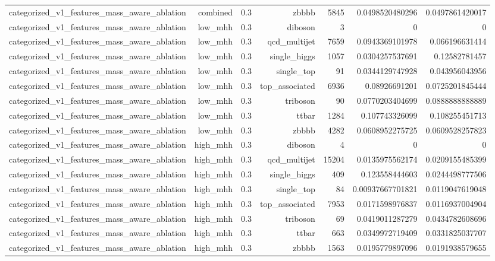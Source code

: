 \begin{table}[htbp]
{\begin{tabular}{lrrrrrr}
categorized\_v1\_features\_mass\_aware\_ablation & combined & 0.3 & zbbbb & 5845 & 0.0498520480296 & 0.0497861420017 \\
categorized\_v1\_features\_mass\_aware\_ablation & low\_mhh & 0.3 & diboson & 3 & 0 & 0 \\
categorized\_v1\_features\_mass\_aware\_ablation & low\_mhh & 0.3 & qcd\_multijet & 7659 & 0.0943369101978 & 0.066196631414 \\
categorized\_v1\_features\_mass\_aware\_ablation & low\_mhh & 0.3 & single\_higgs & 1057 & 0.0304257537691 & 0.12582781457 \\
categorized\_v1\_features\_mass\_aware\_ablation & low\_mhh & 0.3 & single\_top & 91 & 0.0344129747928 & 0.043956043956 \\
categorized\_v1\_features\_mass\_aware\_ablation & low\_mhh & 0.3 & top\_associated & 6936 & 0.08926691201 & 0.0725201845444 \\
categorized\_v1\_features\_mass\_aware\_ablation & low\_mhh & 0.3 & triboson & 90 & 0.0770203404699 & 0.0888888888889 \\
categorized\_v1\_features\_mass\_aware\_ablation & low\_mhh & 0.3 & ttbar & 1284 & 0.107743326099 & 0.108255451713 \\
categorized\_v1\_features\_mass\_aware\_ablation & low\_mhh & 0.3 & zbbbb & 4282 & 0.0608952275725 & 0.0609528257823 \\
categorized\_v1\_features\_mass\_aware\_ablation & high\_mhh & 0.3 & diboson & 4 & 0 & 0 \\
categorized\_v1\_features\_mass\_aware\_ablation & high\_mhh & 0.3 & qcd\_multijet & 15204 & 0.0135975562174 & 0.0209155485399 \\
categorized\_v1\_features\_mass\_aware\_ablation & high\_mhh & 0.3 & single\_higgs & 409 & 0.123558444603 & 0.0244498777506 \\
categorized\_v1\_features\_mass\_aware\_ablation & high\_mhh & 0.3 & single\_top & 84 & 0.00937667701821 & 0.0119047619048 \\
categorized\_v1\_features\_mass\_aware\_ablation & high\_mhh & 0.3 & top\_associated & 7953 & 0.0171598976837 & 0.0116937004904 \\
categorized\_v1\_features\_mass\_aware\_ablation & high\_mhh & 0.3 & triboson & 69 & 0.0419011287279 & 0.0434782608696 \\
categorized\_v1\_features\_mass\_aware\_ablation & high\_mhh & 0.3 & ttbar & 663 & 0.0349972719409 & 0.0331825037707 \\
categorized\_v1\_features\_mass\_aware\_ablation & high\_mhh & 0.3 & zbbbb & 1563 & 0.0195779897096 & 0.0191938579655 \\

\end{tabular}}
\end{table}
